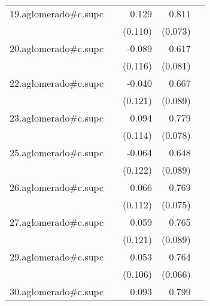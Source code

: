 {\begin{longtable}{l*{4}{D{.}{.}{-1}}}
\addlinespace
19.aglomerado#c.supc&                     &       0.129         &       0.811\sym{***}&                     \\
            &                     &     (0.110)         &     (0.073)         &                     \\
\addlinespace
20.aglomerado#c.supc&                     &      -0.089         &       0.617\sym{***}&                     \\
            &                     &     (0.116)         &     (0.081)         &                     \\
\addlinespace
22.aglomerado#c.supc&                     &      -0.040         &       0.667\sym{***}&                     \\
            &                     &     (0.121)         &     (0.089)         &                     \\
\addlinespace
23.aglomerado#c.supc&                     &       0.094         &       0.779\sym{***}&                     \\
            &                     &     (0.114)         &     (0.078)         &                     \\
\addlinespace
25.aglomerado#c.supc&                     &      -0.064         &       0.648\sym{***}&                     \\
            &                     &     (0.122)         &     (0.089)         &                     \\
\addlinespace
26.aglomerado#c.supc&                     &       0.066         &       0.769\sym{***}&                     \\
            &                     &     (0.112)         &     (0.075)         &                     \\
\addlinespace
27.aglomerado#c.supc&                     &       0.059         &       0.765\sym{***}&                     \\
            &                     &     (0.121)         &     (0.089)         &                     \\
\addlinespace
29.aglomerado#c.supc&                     &       0.053         &       0.764\sym{***}&                     \\
            &                     &     (0.106)         &     (0.066)         &                     \\
\addlinespace
30.aglomerado#c.supc&                     &       0.093         &       0.799\sym{***}&                     \\

\end{longtable}}
